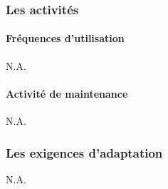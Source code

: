 \subsubsection{Les activités}

\paragraph{Fréquences d'utilisation}
N.A.

\paragraph{Activité de maintenance}
N.A.

\subsubsection{Les exigences d'adaptation}
N.A.